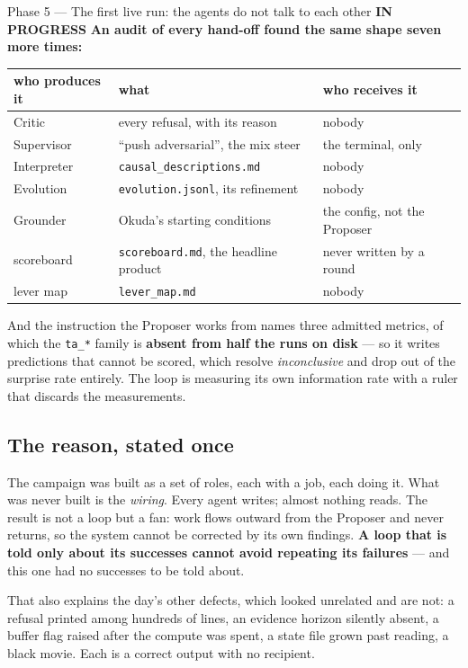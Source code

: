 \documentclass[11pt,a4paper]{article}
\newcommand{\code}[1]{\texttt{#1}}
\newcommand{\prog}{\textcolor{warn}{\textbf{IN PROGRESS}}}
\begin{document}
\begin{phasebox}{Phase 5 --- The first live run: the agents do not talk to each other \hfill \prog}
\textbf{An audit of every hand-off found the same shape seven more times:}

\begin{center}\small
\begin{tabular}{@{}l l l@{}}
\toprule
\textbf{who produces it} & \textbf{what} & \textbf{who receives it}\\
\midrule
Critic        & every refusal, with its reason      & \textcolor{bad}{nobody}\\
Supervisor    & ``push adversarial'', the mix steer  & \textcolor{bad}{the terminal, only}\\
Interpreter   & \code{causal\_descriptions.md}       & \textcolor{bad}{nobody}\\
Evolution     & \code{evolution.jsonl}, its refinement & \textcolor{bad}{nobody}\\
Grounder      & Okuda's starting conditions          & \textcolor{bad}{the config, not the Proposer}\\
scoreboard    & \code{scoreboard.md}, the headline product & \textcolor{bad}{never written by a round}\\
lever map     & \code{lever\_map.md}                 & \textcolor{bad}{nobody}\\
\bottomrule
\end{tabular}
\end{center}

And the instruction the Proposer works from names three admitted metrics, of which the
\code{ta\_*} family is \textbf{absent from half the runs on disk} --- so it writes predictions
that cannot be scored, which resolve \emph{inconclusive} and drop out of the surprise rate
entirely. The loop is measuring its own information rate with a ruler that discards the
measurements.

\subsection*{The reason, stated once}

The campaign was built as a set of roles, each with a job, each doing it. What was never built is
the \emph{wiring}. Every agent writes; almost nothing reads. The result is not a loop but a fan:
work flows outward from the Proposer and never returns, so the system cannot be corrected by its
own findings. \textbf{A loop that is told only about its successes cannot avoid repeating its
failures} --- and this one had no successes to be told about.

That also explains the day's other defects, which looked unrelated and are not: a refusal printed
among hundreds of lines, an evidence horizon silently absent, a buffer flag raised after the
compute was spent, a state file grown past reading, a black movie. Each is a correct output with
no recipient.


\end{phasebox}
\end{document}
